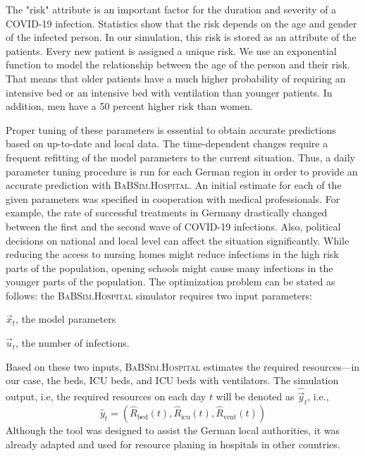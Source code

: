 \documentclass[conference]{IEEEtran}
\newcommand{\babsimhospital}{\textsc{BaBSim.Hospital}\xspace}
\begin{document}
The "risk" attribute is an important factor for the duration and severity of a COVID-19 infection. 
Statistics show that the risk depends on the age and gender of the infected person. 
In our simulation, this risk is stored as an attribute of the patients. 
Every new patient is assigned a unique risk. 
We use an exponential function to model the relationship between the age of the person and their risk.
That means that older patients have a much higher probability of requiring an intensive bed or an intensive bed with ventilation than younger patients. 
In addition, men have a 50 percent higher risk than women. 



Proper tuning of these parameters is essential to obtain accurate predictions based on up-to-date and local data. 
The time-dependent changes require a frequent refitting of the model parameters to the current situation.
Thus, a daily parameter tuning procedure is run for each German region in order to provide an accurate prediction with \babsimhospital. 
An initial estimate for each of the given parameters was specified in cooperation with medical professionals. 
For example, the rate of successful treatments in Germany drastically changed between the first and the second wave of COVID-19 infections. 
Also, political decisions on national and local level can affect the situation significantly. 
While reducing the access to nursing homes might reduce infections in the high risk parts of the population, opening schools might cause many infections in the younger parts of the population. The optimization problem can be stated as follows:
the \babsimhospital simulator requires two input parameters:
\begin{compactenum}
\item $\vec{x}_t$, the model parameters
\item $\vec{u}_t$, the number of infections.
\end{compactenum}
Based on these two inputs, \babsimhospital estimates the required resources---in our case, the beds, \gls{ICU} beds,  and \gls{ICU} beds with ventilators.
The simulation output, i.e, the required resources on each day $t$ will be denoted as $\hat{\vec{y}}_t$, i.e., 
\begin{equation}\label{eq:haty}
\hat{y}_t = \left( \hat{R}_{\text{bed}}(t),   \hat{R}_{\text{icu}}(t), \hat{R}_{\text{vent}}(t) \right)
\end{equation}
Although the tool was designed to assist the German local authorities, it was already adapted and used for resource planing in hospitals in other countries.
\end{document}
